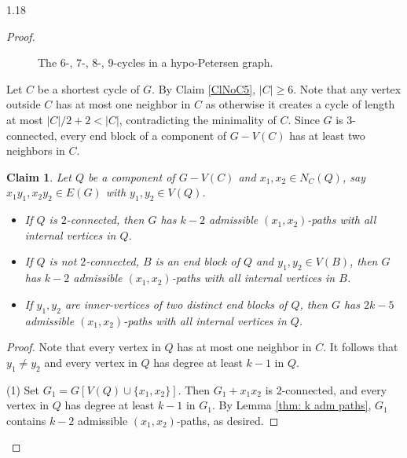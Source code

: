 \documentclass[10pt]{article}
\newtheorem{claim}{Claim}
\begin{document}
\begin{spacing}{1.18}
\begin{proof}
\begin{figure}[ht]
\caption{The 6-, 7-, 8-, 9-cycles in a hypo-Petersen graph.}\label{FiCycle6789Hypo}
\end{figure}

    Let $C$ be a shortest cycle of $G$. By Claim \ref{ClNoC5}, $|C|\geqslant 6$. Note that any vertex outside $C$ has at most one neighbor in $C$ as otherwise it creates a cycle of length at most $|C|/2+2 < |C|$, contradicting the minimality of $C$. Since $G$ is 3-connected, every end block of a component of $G-V(C)$ has at least two neighbors in $C$. 
    
\begin{claim}\label{ClComponentAdmissiblePath}
    Let $Q$ be a component of $G-V(C)$ and $x_1,x_2\in N_C(Q)$, say $x_1y_1,x_2y_2\in E(G)$ with $y_1,y_2\in V(Q)$. 
    \begin{itemize}
        \item[(1)] If $Q$ is $2$-connected, then $G$ has $k-2$ admissible $(x_1,x_2)$-paths with all internal vertices in $Q$.
        \item[(2)] If $Q$ is not $2$-connected, $B$ is an end block of $Q$ and $y_1,y_2\in V(B)$, then $G$ has $k-2$ admissible $(x_1,x_2)$-paths with all internal vertices in $B$.
        \item[(3)] If $y_1,y_2$ are inner-vertices of two distinct end blocks of $Q$, then $G$ has $2k-5$ admissible $(x_1,x_2)$-paths with all internal vertices in $Q$.
    \end{itemize}
\end{claim}

\begin{proof}
    Note that every vertex in $Q$ has at most one neighbor in $C$. It follows that $y_1\neq y_2$ and every vertex in $Q$ has degree at least $k-1$ in $Q$. 

    (1) Set $G_1=G[V(Q)\cup\{x_1,x_2\}]$. Then $G_1+x_1x_2$ is 2-connected, and every vertex in $Q$ has degree at least $k-1$ in $G_1$. By Lemma \ref{thm: k adm paths}, $G_1$ contains $k-2$ admissible $(x_1,x_2)$-paths, as desired.


\end{proof}
\end{proof}
\end{spacing}
\end{document}
